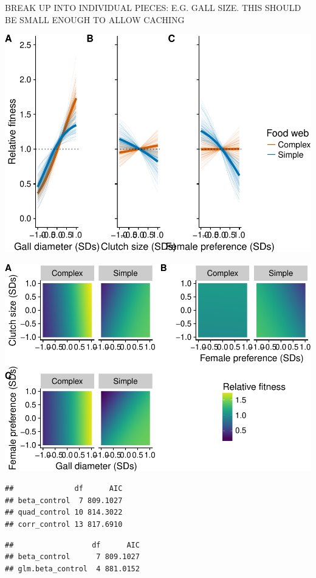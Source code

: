 \documentclass[]{elsarticle} %
\makeatletter
\def\maxwidth{\ifdim\Gin@nat@width>\linewidth\linewidth
\else\Gin@nat@width\fi}
\let\Oldincludegraphics\includegraphics
\renewcommand{\includegraphics}[1]{\Oldincludegraphics[width=\maxwidth]{#1}}
\makeatother
\begin{document}
BREAK UP INTO INDIVIDUAL PIECES: E.G. GALL SIZE. THIS SHOULD BE SMALL
ENOUGH TO ALLOW CACHING

\includegraphics{elsevier_test_files/figure-latex/Plot Univariate Landscapes-1.pdf}

\includegraphics{elsevier_test_files/figure-latex/Plot Multivariate Fitness Landscape-1.pdf}

\begin{verbatim}
##              df      AIC
## beta_control  7 809.1027
## quad_control 10 814.3022
## corr_control 13 817.6910
\end{verbatim}

\begin{verbatim}
##                  df      AIC
## beta_control      7 809.1027
## glm.beta_control  4 881.0152
\end{verbatim}
\end{document}
